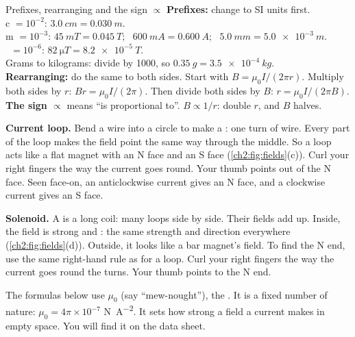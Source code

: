 \begin{toolkit}{Prefixes, rearranging and the sign $\propto$}
\textbf{Prefixes:} change to SI units first.\\
c $= 10^{-2}$: $\qty{3.0}{cm} = \qty{0.030}{m}$.\\
m $= 10^{-3}$: $\qty{45}{mT} = \qty{0.045}{T}$; \ $\qty{600}{mA} = \qty{0.600}{A}$; \
$\qty{5.0}{mm} = \qty{5.0e-3}{m}$.\\
\textmu\ $= 10^{-6}$: $\qty{82}{\micro T} = \qty{8.2e-5}{T}$.\\
Grams to kilograms: divide by 1000, so $\qty{0.35}{g} = \qty{3.5e-4}{kg}$.\\
\textbf{Rearranging:} do the same to both sides. Start with $B = \mu_0 I/(2\pi r)$. Multiply both
sides by $r$: $Br = \mu_0 I/(2\pi)$. Then divide both sides by $B$: $r = \mu_0 I/(2\pi B)$.\\
\textbf{The sign $\propto$} means ``is proportional to''. $B \propto 1/r$: double $r$, and $B$ halves.
\end{toolkit}

\textbf{Current loop.} Bend a wire into a circle to make a : one turn of wire.
Every part of the loop makes the field point the same way through the middle. So a loop acts like
a flat magnet with an N face and an S face (\cref{ch2:fig:fields}(c)). Curl your right fingers the
way the current goes round. Your thumb points out of the N face. Seen face-on, an anticlockwise
current gives an N face, and a clockwise current gives an S face.

\textbf{Solenoid.} A  is a long coil: many loops side by side. Their fields add up.
Inside, the field is strong and \term{uniform}: the same strength and direction everywhere
(\cref{ch2:fig:fields}(d)). Outside, it looks like a bar magnet's field. To find the N end, use the
same right-hand rule as for a loop. Curl your right fingers the way the current goes round the
turns. Your thumb points to the N end.

The formulas below use $\mu_0$ (say ``mew-nought''), the .
It is a fixed number of nature: $\mu_0 = 4\pi \times 10^{-7}$ \si{N.A^{-2}}. It sets how strong
a field a current makes in empty space. You will find it on the data sheet.

